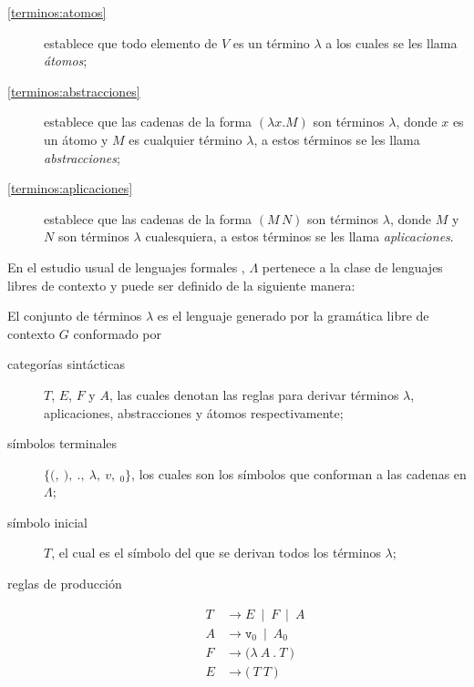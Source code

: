 \begin{description}
\item[\eqref{terminos:atomos}] establece que todo elemento de \( V \) es un término \( λ \) a los cuales se les llama \emph{átomos};
\item[\eqref{terminos:abstracciones}] establece que las cadenas de la forma \( (λx.M) \) son términos \( λ \), donde \( x \) es un átomo y \( M \) es cualquier término \( λ \), a estos términos se les llama \emph{abstracciones};
\item[\eqref{terminos:aplicaciones}] establece que las cadenas de la forma \( (M\, N) \) son términos \( λ \), donde \( M \) y \( N \) son términos \( λ \) cualesquiera, a estos términos se les llama \emph{aplicaciones}.
\end{description}

En el estudio usual de lenguajes formales \cite{Hopcroft:Automata}, \( Λ \) pertenece a la clase de lenguajes libres de contexto y puede ser definido de la siguiente manera:

\begin{defn}[Términos \( λ \)]
  \label{defn:terminos-cfg}
  El conjunto de términos \( λ \) es el lenguaje generado por la gramática libre de contexto \( G \) conformado por

  \begin{description}
  \item[categorías sintácticas] \( T \), \( E \), \( F \) y \( A \), las cuales denotan las reglas para derivar términos \( λ \), aplicaciones, abstracciones y átomos respectivamente;
  \item[símbolos terminales] \( \{\mathtt{(},\ \mathtt{)},\ \mathtt{.},\ λ,\ v,\ {}_{0}\} \), los cuales son los símbolos que conforman a las cadenas en \( Λ \);
  \item[símbolo inicial] \( T \), el cual es el símbolo del que se derivan todos los términos \( λ \);
  \item[reglas de producción]
    \begin{subequations}
    \begin{align}
      \label{terminos-cfg:terminos} \tag{a}
      T & \rightarrow E\ \mid\ F\ \mid\ A \\
      \label{terminos-cfg:atomos} \tag{b}
      A & \rightarrow \mathtt{v}_{0}\ \mid\ A {}_{0} \\
      \label{terminos-cfg:abstracciones} \tag{c}
      F & \rightarrow \mathtt{(} λ\ A\ \mathtt{.}\ T\ \mathtt{)} \\
      \label{terminos-cfg:aplicaciones} \tag{d}
      E & \rightarrow \mathtt{(}\ T\ T\ \mathtt{)}
    \end{align}
  \end{subequations}
  \end{description}
\end{defn}

